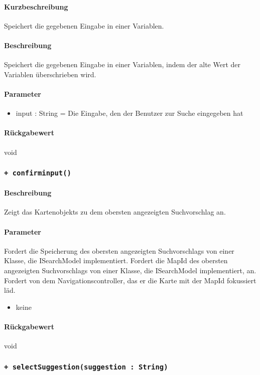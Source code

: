 \paragraph*{Kurzbeschreibung}
Speichert die gegebenen Eingabe in einer Variablen.
\paragraph*{Beschreibung}
Speichert die gegebenen Eingabe in einer Variablen, indem der alte Wert der Variablen überschrieben wird.
\paragraph*{Parameter}
\begin{itemize}
    \item input : String = Die Eingabe, den der Benutzer zur Suche eingegeben hat
\end{itemize}
\paragraph*{Rückgabewert}
void

\subsubsection{\texttt{+ confirminput()}}%
\paragraph*{Beschreibung}
Zeigt das Kartenobjekts zu dem obersten angezeigten Suchvorschlag an.
\paragraph*{Parameter}
Fordert die Speicherung des obersten angezeigten Suchvorschlags von einer Klasse, die ISearchModel implementiert.
Fordert die MapId des obersten angezeigten Suchvorschlags von einer Klasse, die ISearchModel implementiert, an.
Fordert von dem Navigationscontroller, das er die Karte mit der MapId fokussiert läd.
\begin{itemize}
    \item keine
\end{itemize}
\paragraph*{Rückgabewert}
void

\subsubsection{\texttt{+ selectSuggestion(suggestion : String)}}%
